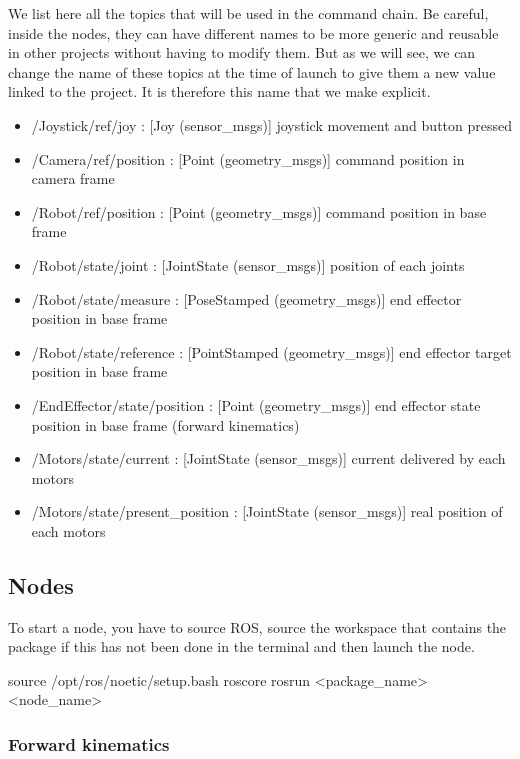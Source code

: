 \hspace{\parindent} We list here all the topics that will be used in the command chain. Be careful, inside the nodes, they can have different names to be more generic and reusable in other projects without having to modify them. But as we will see, we can change the name of these topics at the time of launch to give them a new value linked to the project. It is therefore this name that we make explicit. 
\begin{itemize}
    \item /Joystick/ref/joy : [Joy (sensor\_msgs)] joystick movement and button pressed
    \item /Camera/ref/position : [Point (geometry\_msgs)] command position in camera frame
    \item /Robot/ref/position : [Point (geometry\_msgs)] command position in base frame
    \item /Robot/state/joint : [JointState (sensor\_msgs)] position of each joints
    \item /Robot/state/measure : [PoseStamped (geometry\_msgs)] end effector position in base frame
    \item /Robot/state/reference : [PointStamped (geometry\_msgs)] end effector target position in base frame
    \item /EndEffector/state/position : [Point (geometry\_msgs)] end effector state position in base frame (forward kinematics)
    \item /Motors/state/current : [JointState (sensor\_msgs)] current delivered by each motors
    \item /Motors/state/present\_position : [JointState (sensor\_msgs)] real position of each motors
\end{itemize}
\subsection{Nodes}
\hspace{\parindent} To start a node, you have to source ROS, source the workspace that contains the package if this has not been done in the terminal and then launch the node.
\begin{commandshell}
    source /opt/ros/noetic/setup.bash
    roscore
    rosrun <package_name> <node_name>
\end{commandshell}

\subsubsection{Forward kinematics}

